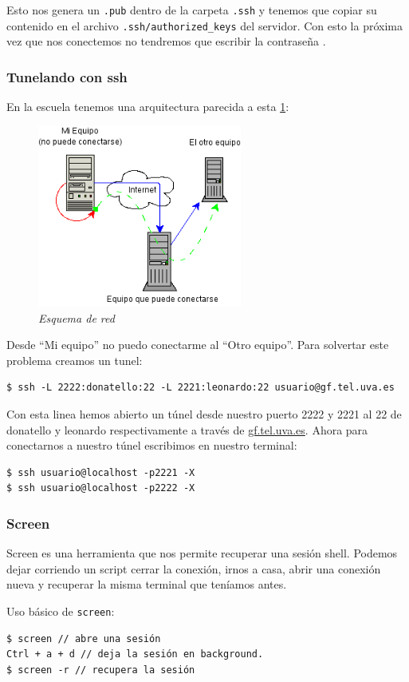 Esto nos genera un \verb|.pub| dentro de la carpeta \verb|.ssh| y tenemos que copiar su contenido en el archivo \verb|.ssh/authorized_keys| del servidor. Con esto la próxima vez que nos conectemos no tendremos que escribir la contraseña \cite{Criptografíaasimétrica}.

\subsubsection{Tunelando con ssh}
En la escuela tenemos una arquitectura parecida a esta \ref{fig:Esquemadered}:

\begin{figure}
	\centering
		\includegraphics[width=0.60\textwidth,natwidth=299,natheight=266]{fig/tunel-ssh2}
	\caption{\emph{Esquema de red}}
        \label{fig:Esquemadered}
\end{figure}

Desde ``Mi equipo'' no puedo conectarme al ``Otro equipo''. Para solvertar este problema creamos un tunel:
\begin{verbatim}
$ ssh -L 2222:donatello:22 -L 2221:leonardo:22 usuario@gf.tel.uva.es
\end{verbatim}

Con esta linea hemos abierto un túnel desde nuestro puerto 2222 y 2221 al 22 de donatello y leonardo respectivamente a través de \url{gf.tel.uva.es}. Ahora para conectarnos a nuestro túnel escribimos en nuestro terminal:
\begin{verbatim}
$ ssh usuario@localhost -p2221 -X
$ ssh usuario@localhost -p2222 -X
\end{verbatim}

\subsubsection{Screen}
Screen es una herramienta que nos permite recuperar una sesión shell. Podemos dejar corriendo un script cerrar la conexión, irnos a casa, abrir una conexión nueva y recuperar la misma terminal que teníamos antes.

Uso básico de \verb|screen|:
\begin{verbatim}
$ screen // abre una sesión
Ctrl + a + d // deja la sesión en background.
$ screen -r // recupera la sesión
\end{verbatim}
\cite{Usodetúnelessshyscreen}
\cite{UsobásicodescreenenLinux}
